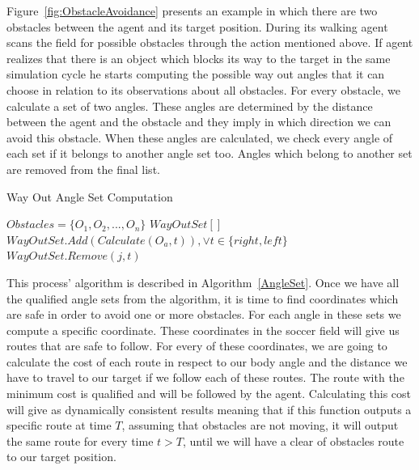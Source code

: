 Figure~\ref{fig:ObstacleAvoidance} presents an example in which there are two obstacles between the agent and its target position. During its walking agent scans the field for possible obstacles through the action mentioned above. If agent realizes that there is an object which blocks its way to the target in the same simulation cycle he starts computing the possible way out angles that it can choose in relation to its observations about all obstacles. For every obstacle, we calculate a set of two angles. These angles are determined by the distance between the agent and the obstacle and they imply in which direction we can avoid this obstacle. When these angles are calculated, we check every angle of each set if it belongs to another angle set too. Angles which belong to another set are removed from the final list.

\begin{algorithm}[ht!]
\caption{Way Out Angle Set Computation}
\label{AngleSet}
\begin{algorithmic}[1]
$Obstacles = \lbrace O_{1},O_{2},...,O_{n} \rbrace $
$WayOutSet[ ]$
\STATE $WayOutSet.Add(Calculate(O_{a},t)),\vee t \in \lbrace right,left \rbrace$
\ENDFOR
{}
\STATE $WayOutSet.Remove(j,t)$
\ENDIF
\ENDFOR
\ENDFOR
\end{algorithmic}
\end{algorithm}

This process' algorithm is described in Algorithm~\ref{AngleSet}. Once we have all the qualified angle sets from the algorithm, it is time to find coordinates which are safe in order to avoid one or more obstacles. For each angle in these sets we compute a specific coordinate. These coordinates in the soccer field will give us routes that are safe to follow. For every of these coordinates, we are going to calculate the cost of each route in respect to our body angle and the distance we have to travel to our target if we follow each of these routes. The route with the minimum cost is qualified and will be followed by the agent. Calculating this cost will give as dynamically consistent results meaning that if this function outputs a specific route at time $T$, assuming that obstacles are not moving, it will output the same route for every time $t > T$, until we will have a clear of obstacles route to our target position.



